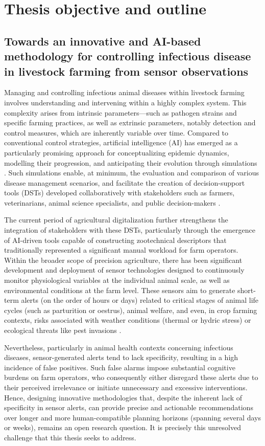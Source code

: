 \section{Thesis objective and outline}
\subsection{Towards an innovative and AI-based methodology for controlling infectious disease in livestock farming from sensor observations}

Managing and controlling infectious animal diseases within livestock farming involves understanding and intervening within a highly complex system. This complexity arises from intrinsic parameters—such as pathogen strains and specific farming practices, as well as extrinsic parameters, notably detection and control measures, which are inherently variable over time. Compared to conventional control strategies, artificial intelligence (AI) has emerged as a particularly promising approach for conceptualizing epidemic dynamics, modelling their progression, and anticipating their evolution through simulations \cite{Ezanno2021}. Such simulations enable, at minimum, the evaluation and comparison of various disease management scenarios, and facilitate the creation of decision-support tools (DSTs) developed collaboratively with stakeholders such as farmers, veterinarians, animal science specialists, and public decision-makers \cite{Ezanno2018}.

The current period of agricultural digitalization further strengthens the integration of stakeholders with these DSTs, particularly through the emergence of AI-driven tools capable of constructing zootechnical descriptors that traditionally represented a significant manual workload for farm operators. Within the broader scope of precision agriculture, there has been significant development and deployment of sensor technologies designed to continuously monitor physiological variables at the individual animal scale, as well as environmental conditions at the farm level. These sensors aim to generate short-term alerts (on the order of hours or days) related to critical stages of animal life cycles (such as parturition or oestrus), animal welfare, and even, in crop farming contexts, risks associated with weather conditions (thermal or hydric stress) or ecological threats like pest invasions \cite{s18082674}.

Nevertheless, particularly in animal health contexts concerning infectious diseases, sensor-generated alerts tend to lack specificity, resulting in a high incidence of false positives. Such false alarms impose substantial cognitive burdens on farm operators, who consequently either disregard these alerts due to their perceived irrelevance or initiate unnecessary and excessive interventions. Hence, designing innovative methodologies that, despite the inherent lack of specificity in sensor alerts, can provide precise and actionable recommendations over longer and more human-compatible planning horizons (spanning several days or weeks), remains an open research question. It is precisely this unresolved challenge that this thesis seeks to address.


